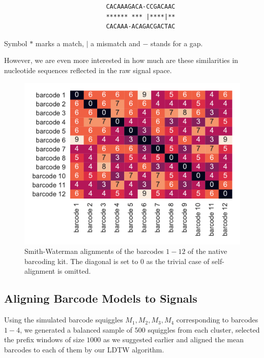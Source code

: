 \begin{verbatim}
                            CACAAAGACA-CCGACAAC
                            ****** *** |****|**
                            CACAAA-ACAGACGACTAC
\end{verbatim}
Symbol $*$ marks a match, $|$ a mismatch and $-$ stands for a gap.

However, we are even more interested in how much are these similarities in nucleotide sequences reflected in the raw signal space.

\begin{figure}[!ht]
    \centering
    \includegraphics[scale=0.8]{images/SW_12.pdf}
    \caption[Local barcode alignments]{Smith-Waterman alignments of the barcodes $1-12$ of the native barcoding kit. The diagonal is set to $0$ as the trivial case of self-alignment is omitted.}
    \label{fig:barcodes_SW}
\end{figure}

\subsection{Aligning Barcode Models to Signals}

Using the simulated barcode squiggles $M_1, M_2, M_3, M_4$ corresponding to barcodes $1-4$, we generated a balanced sample of $500$ squiggles from each cluster, selected the prefix windows of size $1000$ as we suggested earlier and aligned the mean barcodes to each of them by our LDTW algorithm.

